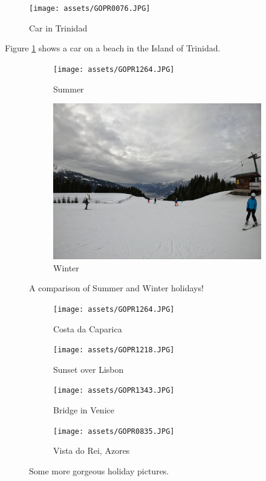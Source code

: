 \documentclass{article}
\begin{document}
\begin{figure}[h!]
  \texttt{[image: assets/GOPR0076.JPG]}
  \caption{Car in Trinidad}
  \label{fig:car}
\end{figure}

Figure \ref{fig:car} shows a car on a beach in the Island of Trinidad.

\begin{figure}[h!]
   \centering
   \begin{subfigure}[b]{0.4\linewidth}
     \texttt{[image: assets/GOPR1264.JPG]}
     \caption{Summer}
   \end{subfigure}
   \begin{subfigure}[b]{0.4\linewidth}
     \includegraphics[width=\linewidth]{assets/GOPR0018.JPG}
     \caption{Winter}
   \end{subfigure}
   \caption{A comparison of Summer and Winter holidays!}
   \label{fig:holidays2x}
\end{figure}

\pagebreak

\begin{figure}[h!]
   \centering
   \begin{subfigure}[b]{0.2\linewidth}
     \texttt{[image: assets/GOPR1264.JPG]}
      \caption{Costa da Caparica}
   \end{subfigure}
   \begin{subfigure}[b]{0.2\linewidth}
     \texttt{[image: assets/GOPR1218.JPG]}
     \caption{Sunset over Lisbon}
   \end{subfigure}
   \begin{subfigure}[b]{0.2\linewidth}
     \texttt{[image: assets/GOPR1343.JPG]}
     \caption{Bridge in Venice}
   \end{subfigure}
   \begin{subfigure}[b]{0.5\linewidth}
     \texttt{[image: assets/GOPR0835.JPG]}
     \caption{Vista do Rei, Azores}
   \end{subfigure}
   \caption{Some more gorgeous holiday pictures.}
   \label{fig:holidays4x}
 \end{figure}
\end{document}
